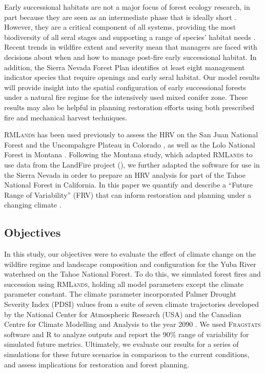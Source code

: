 Early successional habitats are not a major focus of forest ecology research, in part because they are seen as an intermediate phase that is ideally short \citep{Swanson2011}. However, they are a critical component of all systems, providing the most biodiversity of all seral stages and supporting a range of species' habitat needs \citep{Chang1995,Hutto2008,Swanson2011}. Recent trends in wildfire extent and severity mean that managers are faced with decisions about when and how to manage post-fire early successional habitat. In addition, the Sierra Nevada Forest Plan identifies at least eight management indicator species that require openings and early seral habitat. Our model results will provide insight into the spatial configuration of early successional forests under a natural fire regime for the intensively used mixed conifer zone. These results may also be helpful in planning restoration efforts using both prescribed fire and mechanical harvest techniques.

\textsc{RMLands} has been used previously to assess the HRV on the San Juan National Forest and the Uncompahgre Plateau in Colorado \citep{McGarigal2005,McGarigal2005a,Romme2009}, as well as the Lolo National Forest in Montana \citep{Cushman2011}. Following the Montana study, which adapted \textsc{RMLands} to use data from the LandFire project (), we further adapted the software for use in the Sierra Nevada in order to prepare an HRV analysis for part of the Tahoe National Forest in California. In this paper we quantify and describe a ``Future Range of Variability'' (FRV) that can inform restoration and planning under a changing climate \citep{Duncan2010}.


\subsection{Objectives}
In this study, our objectives were to evaluate the effect of climate change on the wildfire regime and landscape composition and configuration for the Yuba River waterhsed on the Tahoe National Forest. To do this, we simulated forest fires and succession using \textsc{RMLands}, holding all model parameters except the climate parameter constant. The climate parameter incorporated Palmer Drought Severity Index (PDSI) values from a suite of seven climate trajectories developed by the National Center for Atmospheric Research (USA) and the Canadian Centre for Climate Modelling and Analysis to the year 2090 \citep{Cook2014}. We used \textsc{Fragstats} software and R to analyze outputs and report the 90\% range of variability for simulated future metrics. Ultimately, we evaluate our results for a series of simulations for these future scenarios in comparison to the current conditions, and assess implications for restoration and forest planning.

















